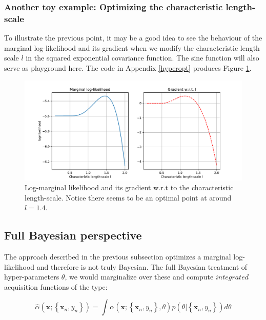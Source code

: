 \documentclass[10pt,a4paper,twoside]{book}
\begin{document}
\subsubsection{Another toy example: Optimizing the characteristic length-scale}

To illustrate the previous point, it may be a good idea to see the behaviour of the marginal log-likelihood and its gradient when we modify the characteristic length scale $l$ in the squared exponential covariance function. The sine function will also serve as playground here. The code in Appendix \ref{hyperopt} produces Figure \ref{fig:logmarginal}.


\begin{figure}
\caption{Log-marginal likelihood and its gradient w.r.t to the characteristic length-scale. Notice there seems to be an optimal point at around $l = 1.4$.}
\label{fig:logmarginal}
\includegraphics[width=\textwidth]{figures/chapter2/logmarginal}
\end{figure}

\subsection{Full Bayesian perspective}

The approach described in the previous subsection optimizes a marginal log-likelihood and therefore is not truly Bayesian. The full Bayesian treatment of hyper-parameters $\theta$, we would marginalize over these and compute $\textit{integrated}$ acquisition functions of the type:

\begin{equation}
\hat{\alpha}(\boldsymbol{x}; \left\lbrace \boldsymbol{x}_n, y_n \right\rbrace ) = \int \alpha(\boldsymbol{x}; \left\lbrace \boldsymbol{x}_n, y_n \right\rbrace, \theta) p(\theta |\left\lbrace \boldsymbol{x}_n, y_n\right\rbrace) d\theta
\end{equation}
\end{document}
